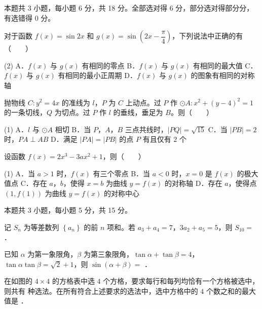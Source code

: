 \par\medskip


\begin{gktip}
本题共 3 小题，每小题 6 分，共 18 分。全部选对得 6 分，部分选对得部分分，有选错得 0 分。
\end{gktip}

对于函数 $f(x)=\sin2x$ 和 $g(x)=\sin\left(2x-\dfrac\pi4\right)$，下列说法中正确的有（　　）

\begin{gkopts}(2)
\task A．$f(x)$ 与 $g(x)$ 有相同的零点
\task B．$f(x)$ 与 $g(x)$ 有相同的最大值
\task C．$f(x)$ 与 $g(x)$ 有相同的最小正周期
\task D．$f(x)$ 与 $g(x)$ 的图象有相同的对称轴
\end{gkopts}

抛物线 $C:y^{2}=4x$ 的准线为 $l$，$P$ 为 $C$ 上动点。过 $P$ 作 $\odot A:x^{2}+(y-4)^{2}=1$ 的一条切线，$Q$ 为切点。过 $P$ 作 $l$ 的垂线，垂足为 $B$。则（　　）

\begin{gkopts}(1)
\task A．$l$ 与 $\odot A$ 相切
\task B．当 $P$，$A$，$B$ 三点共线时，$|PQ|=\sqrt{15}$
\task C．当 $|PB|=2$ 时，$PA\perp AB$
\task D．满足 $|PA|=|PB|$ 的点 $P$ 有且仅有 $2$ 个
\end{gkopts}

设函数 $f(x)=2x^{3}-3ax^{2}+1$，则（　　）

\begin{gkopts}(1)
\task A．当 $a>1$ 时，$f(x)$ 有三个零点
\task B．当 $a<0$ 时，$x=0$ 是 $f(x)$ 的极大值点
\task C．存在 $a$，$b$，使得 $x=b$ 为曲线 $y=f(x)$ 的对称轴
\task D．存在 $a$，使得点 $\left(1,f(1)\right)$ 为曲线 $y=f(x)$ 的对称中心
\end{gkopts}

\par\medskip


\begin{gktip}
本题共 3 小题，每小题 5 分，共 15 分。
\end{gktip}

记 $S_n$ 为等差数列 $\left\{a_n\right\}$ 的前 $n$ 项和。若 $a_3+a_4=7$，$3a_2+a_5=5$，则 $S_{10}=$ \gkblank{}．

已知 $\alpha$ 为第一象限角，$\beta$ 为第三象限角，$\tan\alpha+\tan\beta=4$，$\tan\alpha\tan\beta=\sqrt2+1$，则 $\sin(\alpha+\beta)=$ \gkblank{}．

在如图的 $4\times4$ 的方格表中选 $4$ 个方格，要求每行和每列均恰有一个方格被选中，则共有 \gkblank{} 种选法。在所有符合上述要求的选法中，选中方格中的 $4$ 个数之和的最大值是 \gkblank{}．

